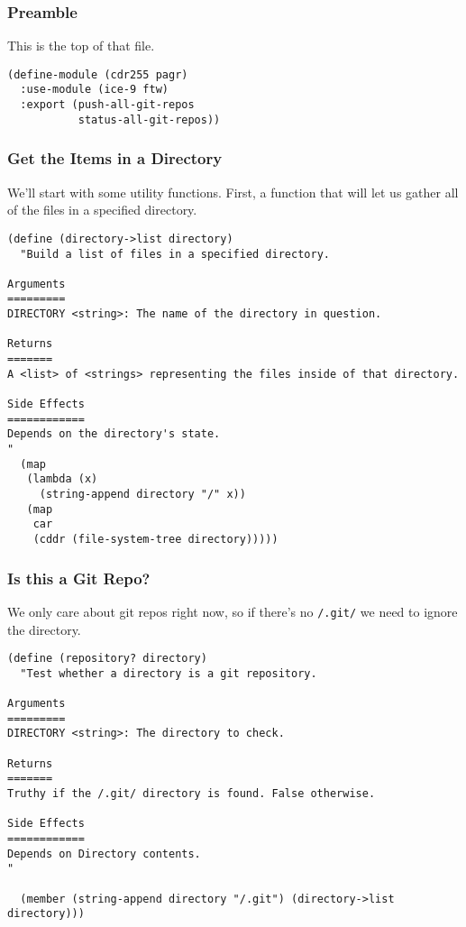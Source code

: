 \documentclass[11pt]{article}
\begin{document}
\subsubsection{Preamble}
\label{sec:org9096e29}
This is the top of that file.

\begin{verbatim}
(define-module (cdr255 pagr)
  :use-module (ice-9 ftw)
  :export (push-all-git-repos
           status-all-git-repos))
\end{verbatim}

\subsubsection{Get the Items in a Directory}
\label{sec:org89e48bd}
We'll start with some utility functions. First, a function that will let us
gather all of the files in a specified directory.

\begin{verbatim}
(define (directory->list directory)
  "Build a list of files in a specified directory.

Arguments
=========
DIRECTORY <string>: The name of the directory in question.

Returns
=======
A <list> of <strings> representing the files inside of that directory.

Side Effects
============
Depends on the directory's state.
"
  (map
   (lambda (x)
     (string-append directory "/" x))
   (map
    car
    (cddr (file-system-tree directory)))))
\end{verbatim}

\subsubsection{Is this a Git Repo?}
\label{sec:org2d66fde}
We only care about git repos right now, so if there's no \texttt{/.git/} we need to
ignore the directory.

\begin{verbatim}
(define (repository? directory)
  "Test whether a directory is a git repository.

Arguments
=========
DIRECTORY <string>: The directory to check.

Returns
=======
Truthy if the /.git/ directory is found. False otherwise.

Side Effects
============
Depends on Directory contents.
"

  (member (string-append directory "/.git") (directory->list directory)))
\end{verbatim}
\end{document}
